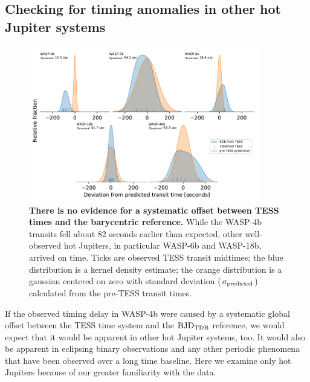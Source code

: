 \documentclass[12pt,twocolumn,tighten]{aastex62}
\begin{document}
\subsection{Checking for timing anomalies in other hot Jupiter systems}
\label{sec:hj_verification}

\begin{figure}[ht!]
  \begin{center}
    \leavevmode
    \includegraphics[width=0.9\textwidth]{f7.pdf}
  \end{center}
  \vspace{-0.5cm}
  \caption{
    {\bf There is no evidence for a systematic offset between TESS
    times and the barycentric reference.} While the WASP-4b transits
    fell about 82 seconds earlier than expected, other well-observed
    hot Jupiters, in particular WASP-6b and WASP-18b, arrived on time.
    Ticks are observed TESS transit midtimes; the blue distribution is
    a kernel density estimate; the orange distribution is a gaussian
    centered on zero with standard deviation ($\sigma_{\rm
    predicted}$) calculated from the pre-TESS transit times.
    \label{fig:hjs}
  }
\end{figure}

If the observed timing delay in WASP-4b were caused by a systematic
global offset between the TESS time system and the ${\rm BJD}_{\rm
TDB}$ reference, we would expect that it would be apparent in other
hot Jupiter systems, too. It would also be apparent in eclipsing
binary observations and any other periodic phenomena that have been
observed over a long time baseline. Here we examine only hot Jupiters
because of our greater familiarity with the data.
\end{document}
